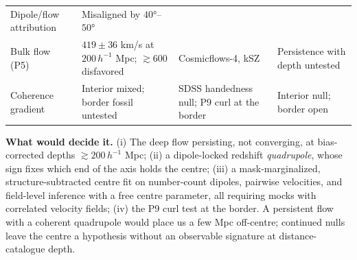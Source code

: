 \documentclass[
]{article}
\begin{document}
\begin{longtable}[]{@{}llll@{}}
\begin{minipage}[t]{0.22\columnwidth}
Dipole/flow attribution\strut
\end{minipage} & \begin{minipage}[t]{0.22\columnwidth}\raggedright
Misaligned by \(40°\)--\(50°\)\strut
\end{minipage}\tabularnewline
\begin{minipage}[t]{0.22\columnwidth}\raggedright
Bulk flow (P5)\strut
\end{minipage} & \begin{minipage}[t]{0.22\columnwidth}\raggedright
\(419 \pm 36\) km/s at \(200\,h^{-1}\) Mpc; \(\gtrsim 600\)
disfavored\strut
\end{minipage} & \begin{minipage}[t]{0.22\columnwidth}\raggedright
Cosmicflows-4, kSZ\strut
\end{minipage} & \begin{minipage}[t]{0.22\columnwidth}\raggedright
Persistence with depth untested\strut
\end{minipage}\tabularnewline
\begin{minipage}[t]{0.22\columnwidth}\raggedright
Coherence gradient\strut
\end{minipage} & \begin{minipage}[t]{0.22\columnwidth}\raggedright
Interior mixed; border fossil untested\strut
\end{minipage} & \begin{minipage}[t]{0.22\columnwidth}\raggedright
SDSS handedness null; P9 curl at the border\strut
\end{minipage} & \begin{minipage}[t]{0.22\columnwidth}\raggedright
Interior null; border open\strut
\end{minipage}\tabularnewline
\bottomrule
\end{longtable}

\textbf{What would decide it.} (i) The deep flow persisting, not
converging, at bias-corrected depths \(\gtrsim 200\,h^{-1}\) Mpc; (ii) a
dipole-locked redshift \emph{quadrupole}, whose sign fixes which end of
the axis holds the centre; (iii) a mask-marginalized,
structure-subtracted centre fit on number-count dipoles, pairwise
velocities, and field-level inference with a free centre parameter, all
requiring mocks with correlated velocity fields; (iv) the P9 curl test
at the border. A persistent flow with a coherent quadrupole would place
us a few Mpc off-centre; continued nulls leave the centre a hypothesis
without an observable signature at distance-catalogue depth.
\end{document}
